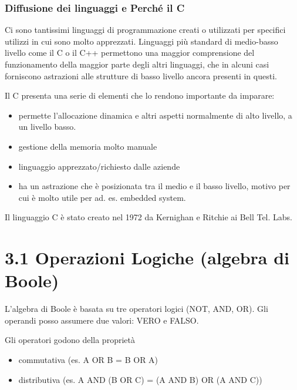 \documentclass[
  paper=a4,
  oneside  ,captions=tableheading
]{scrbook}
\providecommand{\tightlist}{%
  \setlength{\itemsep}{0pt}\setlength{\parskip}{0pt}}
\begin{document}
\hypertarget{diffusione-dei-linguaggi-e-perchuxe9-il-c}{%
\subsubsection{Diffusione dei linguaggi e Perché il
C}\label{diffusione-dei-linguaggi-e-perchuxe9-il-c}}

Ci sono tantissimi linguaggi di programmazione creati o utilizzati per
specifici utilizzi in cui sono molto apprezzati. Linguaggi più standard
di medio-basso livello come il C o il C++ permettono una maggior
comprensione del funzionamento della maggior parte degli altri
linguaggi, che in alcuni casi forniscono astrazioni alle strutture di
basso livello ancora presenti in questi.

Il C presenta una serie di elementi che lo rendono importante da
imparare:

\begin{itemize}
\tightlist
\item
  permette l'allocazione dinamica e altri aspetti normalmente di alto
  livello, a un livello basso.
\item
  gestione della memoria molto manuale
\item
  linguaggio apprezzato/richiesto dalle aziende
\item
  ha un astrazione che è posizionata tra il medio e il basso livello,
  motivo per cui è molto utile per ad. es. embedded system.
\end{itemize}

Il linguaggio C è stato creato nel 1972 da Kernighan e Ritchie ai Bell
Tel. Labs.

\hypertarget{operazioni-logiche-algebra-di-boole}{%
\section{3.1 Operazioni Logiche (algebra di
Boole)}\label{operazioni-logiche-algebra-di-boole}}

L'algebra di Boole è basata su tre operatori logici (NOT, AND, OR). Gli
operandi posso assumere due valori: VERO e FALSO.

Gli operatori godono della proprietà

\begin{itemize}
\tightlist
\item
  commutativa (es. A OR B = B OR A)
\item
  distributiva (es. A AND (B OR C) = (A AND B) OR (A AND C))
\end{itemize}
\end{document}
